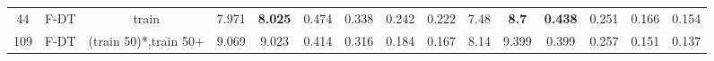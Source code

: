 \begin{table}
\begin{tabular}{@{\hskip3pt}c@{\hskip3pt}c@{\hskip3pt}c@{\hskip3pt}c@{\hskip3pt}c@{\hskip3pt}c@{\hskip3pt}c@{\hskip3pt}c@{\hskip3pt}c@{\hskip3pt}c@{\hskip3pt}c@{\hskip3pt}c@{\hskip3pt}c@{\hskip3pt}c@{\hskip3pt}c}
         44 &           F-DT &                     train &             7.971 &  \textbf{8.025} &          0.474 &           0.338 &           0.242 &           0.222 &                7.48 &  \textbf{8.7} &  \textbf{0.438} &           0.251 &           0.166 &          0.154 \\
        109 &           F-DT &     (train 50)*,train 50+ &             9.069 &           9.023 &          0.414 &           0.316 &           0.184 &           0.167 &                8.14 &         9.399 &           0.399 &           0.257 &           0.151 &          0.137 \\
\bottomrule
\end{tabular}
\end{table}
